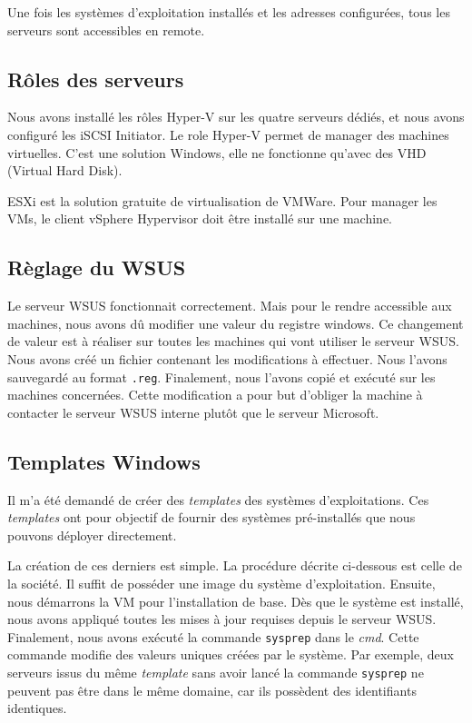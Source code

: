 Une fois les systèmes d'exploitation installés et les adresses configurées, tous les serveurs sont accessibles en remote. 

\subsection{Rôles des serveurs}
Nous avons installé les rôles Hyper-V sur les quatre serveurs dédiés, et nous avons configuré les iSCSI Initiator. 
Le role Hyper-V permet de manager des machines virtuelles. 
C'est une solution Windows, elle ne fonctionne qu'avec des VHD (Virtual Hard Disk). 

ESXi est la solution gratuite de virtualisation de VMWare. 
Pour manager les VMs, le client vSphere Hypervisor doit être installé sur une machine.

\subsection{Règlage du WSUS}
Le serveur WSUS fonctionnait correctement.
Mais pour le rendre accessible aux machines, nous avons dû modifier une valeur du registre windows.
Ce changement de valeur est à réaliser sur toutes les machines qui vont utiliser le serveur WSUS.
Nous avons créé un fichier contenant les modifications à effectuer.
Nous l'avons sauvegardé au format \texttt{.reg}.
Finalement, nous l'avons copié et exécuté sur les machines concernées. 
Cette modification a pour but d'obliger la machine à contacter le serveur WSUS interne plutôt que le serveur Microsoft. 

\subsection{Templates Windows}
Il m'a été demandé de créer des \textit{templates} des systèmes d'exploitations.
Ces \textit{templates} ont pour objectif de fournir des systèmes pré-installés que nous pouvons déployer directement.

La création de ces derniers est simple. 
La procédure décrite ci-dessous est celle de la société.
Il suffit de posséder une image du système d'exploitation.
Ensuite, nous démarrons la VM pour l'installation de base. 
Dès que le système est installé, nous avons appliqué toutes les mises à jour requises depuis le serveur WSUS. 
Finalement, nous avons exécuté la commande \texttt{sysprep} dans le \textit{cmd}.
Cette commande modifie des valeurs uniques créées par le système.
Par exemple, deux serveurs issus du même \textit{template} sans avoir lancé la commande \texttt{sysprep} ne peuvent pas être dans le même domaine, car ils possèdent des identifiants identiques. 


